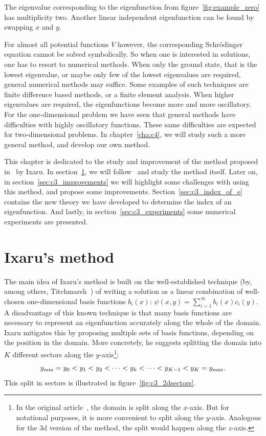 The eigenvalue corresponding to the eigenfunction from figure~\ref{fig:example_zero} has multiplicity two. Another linear independent eigenfunction can be found by swapping $x$ and $y$.

For almost all potential functions $V$ however, the corresponding Schrödinger equation cannot be solved symbolically. So when one is interested in solutions, one has to resort to numerical methods. When only the ground state, that is the lowest eigenvalue, or maybe only few of the lowest eigenvalues are required, general numerical methods may suffice. Some examples of such techniques are finite difference based methods, or a finite element analysis. When higher eigenvalues are required, the eigenfunctions become more and more oscillatory. For the one-dimensional problem we have seen that general methods have difficulties with highly oscillatory functions. These same difficulties are expected for two-dimensional problems. In chapter~\ref{cha:c4}, we will study such a more general method, and develop our own method.

This chapter is dedicated to the study and improvement of the method proposed in~\cite{ixaru_new_2010} by Ixaru. In section~\ref{sec:c3_ixarus_method}, we will follow~\cite{ixaru_new_2010} and study the method itself. Later on, in section~\ref{sec:c3_improvements} we will highlight some challenges with using this method, and propose some improvements. Section~\ref{sec:c3_index_of_e} contains the new theory we have developed to determine the index of an eigenfunction. And lastly, in section~\ref{sec:c3_experiments} some numerical experiments are presented.

\section{Ixaru's method}\label{sec:c3_ixarus_method}

The main idea of Ixaru's method is built on the well-established technique (by, among others, Titchmarsh~\cite{titchmarsh_eigenfunction_1962}) of writing a solution as a linear combination of well-chosen one-dimensional basis functions $b_i(x)$: $\psi(x, y) = \sum_{i=1}^\infty b_i(x) c_i(y)$. A disadvantage of this known technique is that many basis functions are necessary to represent an eigenfunction accurately along the whole of the domain. Ixaru mitigates this by proposing multiple sets of basis functions, depending on the position in the domain. More concretely, he suggests splitting the domain into $K$ different sectors along the $y$-axis\footnote{In the original article~\cite{ixaru_new_2010}, the domain is split along the $x$-axis. But for notational purposes, it is more convenient to split along the $y$-axis. Analogous for the 3d version of the method, the split would happen along the $z$-axis.}:
$$
  {y_{\text{min}}} = y_0 < y_1 < y_2 < \dots < y_k < \dots < y_{K-1} < y_{K} = {y_{\text{max}}}\text{.}
$$
This split in sectors is illustrated in figure~\ref{fig:c3_2dsectors}.

